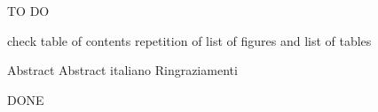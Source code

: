

TO DO

check table of contents repetition of list of figures and list of tables

Abstract
Abstract italiano
Ringraziamenti


DONE